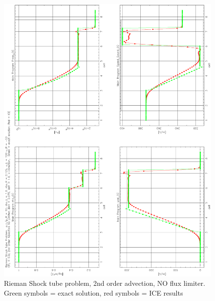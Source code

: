 \documentclass[fleqn]{article}
\begin{document}
%
\begin{figure}[h]
\includegraphics[angle = 270, scale=.7]{Rieman_3.ps}
\caption{Rieman Shock tube problem, 2nd order advection, NO flux limiter.  Green symbols = exact solution, red symbols = ICE results}
\label{fig:p_eq}
\end{figure}
%
\end{document}
